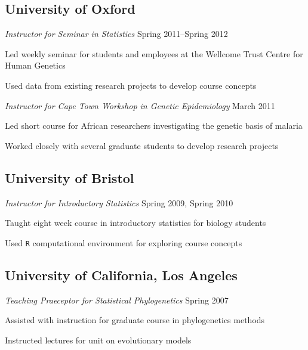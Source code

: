 \documentclass[10pt]{article}
\newenvironment{outerlist}[1][\enskip\textbullet]%
        {\begin{itemize}[#1]}{\end{itemize}%
         \vspace{-.6\baselineskip}}
\newenvironment{innerlist}[1][\enskip\textbullet]%
        {\begin{compactitem}[#1]}{\end{compactitem}}
\begin{document}
\subsection*{University of Oxford}

\begin{outerlist}
\item[] \textit{Instructor for Seminar in Statistics}%
        \hfill {Spring 2011--Spring 2012}
\begin{innerlist}
\item Led weekly seminar for students and employees at the Wellcome Trust Centre for Human Genetics
\item Used data from existing research projects to develop course concepts
\end{innerlist}
\end{outerlist} 

\begin{outerlist}
\item[] \textit{Instructor for Cape Town Workshop in Genetic Epidemiology}%
        \hfill {March 2011}
\begin{innerlist}
\item Led short course for African researchers investigating the genetic basis of malaria
\item Worked closely with several graduate students to develop research projects
\end{innerlist}
\end{outerlist} 


\subsection*{University of Bristol}	
\begin{outerlist}
\item[] \textit{Instructor for Introductory Statistics}%
        \hfill {Spring 2009, Spring 2010}
\begin{innerlist}
\item Taught eight week course in introductory statistics for biology students
\item Used  \verb+R+ computational environment for exploring course concepts
\end{innerlist}
\end{outerlist} 

\subsection*{University of California, Los Angeles}
\begin{outerlist}
\item[] \textit{Teaching Praeceptor for Statistical Phylogenetics}%
        \hfill {Spring 2007}
\begin{innerlist}
\item Assisted with instruction for graduate course in phylogenetics methods
\item Instructed lectures for unit on evolutionary models
\end{innerlist}
\end{outerlist} 
	
\end{document}
